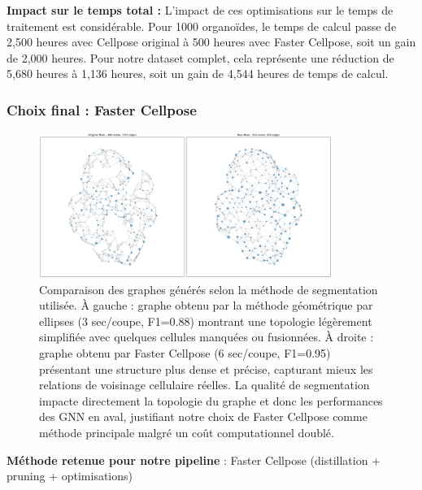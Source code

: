 \textbf{Impact sur le temps total :}
L'impact de ces optimisations sur le temps de traitement est considérable. Pour 1000 organoïdes, le temps de calcul passe de 2,500 heures avec Cellpose original à 500 heures avec Faster Cellpose, soit un gain de 2,000 heures. Pour notre dataset complet, cela représente une réduction de 5,680 heures à 1,136 heures, soit un gain de 4,544 heures de temps de calcul.

\subsubsection{Choix final : Faster Cellpose}

\begin{figure}[htbp]
    \centering
    \includegraphics[width=0.85\textwidth]{../img/graph_comparison.png}
    \caption{Comparaison des graphes générés selon la méthode de segmentation utilisée. À gauche : graphe obtenu par la méthode géométrique par ellipses (3 sec/coupe, F1=0.88) montrant une topologie légèrement simplifiée avec quelques cellules manquées ou fusionnées. À droite : graphe obtenu par Faster Cellpose (6 sec/coupe, F1=0.95) présentant une structure plus dense et précise, capturant mieux les relations de voisinage cellulaire réelles. La qualité de segmentation impacte directement la topologie du graphe et donc les performances des GNN en aval, justifiant notre choix de Faster Cellpose comme méthode principale malgré un coût computationnel doublé.}
    \label{fig:graph_comparison}
\end{figure}

\textbf{Méthode retenue pour notre pipeline} : Faster Cellpose (distillation + pruning + optimisations)

